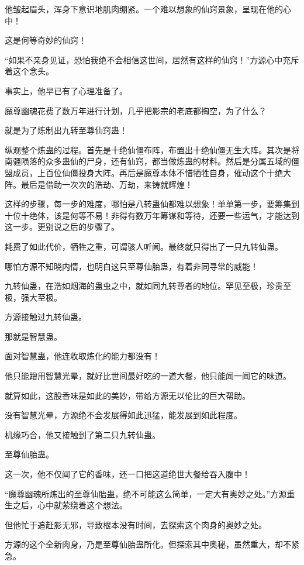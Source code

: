 \begin{this_body}
他皱起眉头，浑身下意识地肌肉绷紧。一个难以想象的仙窍景象，呈现在他的心中！

这是何等奇妙的仙窍！

“如果不亲身见证，恐怕我绝不会相信这世间，居然有这样的仙窍！”方源心中充斥着这个念头。

事实上，他早已有了心理准备了。

魔尊幽魂花费了数万年进行计划，几乎把影宗的老底都掏空，为了什么？

就是为了炼制出九转至尊仙窍蛊！

纵观整个炼蛊的过程。首先是十绝仙僵布阵，布置出十绝仙僵无生大阵。其次是将南疆陨落的众多蛊仙的尸身，还有仙窍，都当做炼蛊的材料。然后是分属五域的僵盟成员，上百位仙僵投身大阵。再后是魔尊本体不惜牺牲自身，催动这个十绝大阵。最后是借助一次次的浩劫、万劫，来铸就辉煌！

这样的步骤，每一步的难度，哪怕是八转蛊仙都难以想象！单单第一步，要筹集到十位十绝体，该是何等不易！非得有数万年筹谋和等待，还要一些运气，才能达到这一步。更别说之后的步骤了。

耗费了如此代价，牺牲之重，可谓骇人听闻。最终就只得出了一只九转仙蛊。

哪怕方源不知晓内情，也明白这只至尊仙胎蛊，有着非同寻常的威能！

九转仙蛊，在浩如烟海的蛊虫之中，就如同九转尊者的地位。罕见至极，珍贵至极，强大至极。

方源接触过九转仙蛊。

那就是智慧蛊。

面对智慧蛊，他连收取炼化的能力都没有！

他只能蹭用智慧光晕，就好比世间最好吃的一道大餐，他只能闻一闻它的味道。

就算如此，这股香味是如此的美妙，带给方源无以伦比的巨大帮助。

没有智慧光晕，方源绝不会发展得如此迅猛，能发展到如此程度。

机缘巧合，他又接触到了第二只九转仙蛊。

至尊仙胎蛊。

这一次，他不仅闻了它的香味，还一口把这道绝世大餐给吞入腹中！

“魔尊幽魂所炼出的至尊仙胎蛊，绝不可能这么简单，一定大有奥妙之处。”方源重生之后，心中就萦绕着这个想法。

但他忙于追赶影无邪，导致根本没有时间，去探索这个肉身的奥妙之处。

方源的这个全新肉身，乃是至尊仙胎蛊所化。但探索其中奥秘，虽然重大，却不紧急。


\end{this_body}
